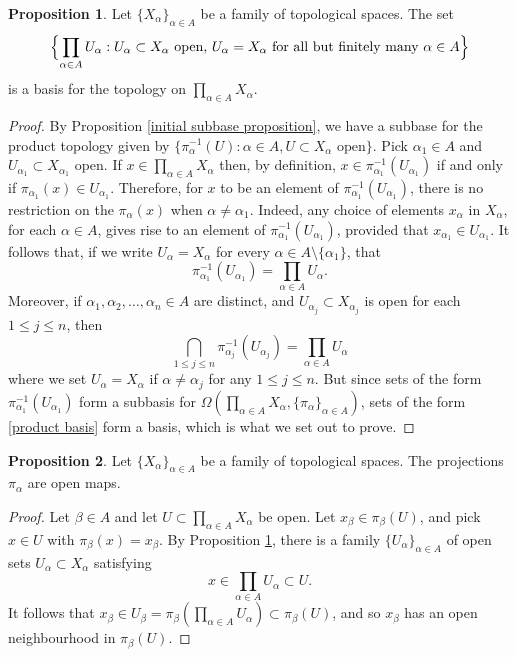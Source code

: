 \documentclass{book}
\theoremstyle{definition}
\newtheorem{proposition}{Proposition}[section]
\theoremstyle{remark}
\newcommand{\initial}[2]{\Omega(#1, #2)}
\begin{document}
\begin{proposition}\label{product basis proposition}
    Let $\{X_\alpha\}_{\alpha\in A}$ be a family of topological spaces. The set
        $$\Bigl\{\prod_{\alpha\in A} U_\alpha : U_\alpha\subset X_\alpha\text{ open},\,U_\alpha=X_\alpha\text{ for all but finitely many }\alpha\in A\Bigr\}$$
    is a basis for the topology on $\prod_{\alpha\in A} X_\alpha$.
\end{proposition}
\begin{proof}
    By Proposition \ref{initial subbase proposition}, we have a subbase for the product topology given by $\{\pi_\alpha^{-1}(U) : \alpha\in A, U\subset X_\alpha\text{ open}\}$. Pick $\alpha_1\in A$ and $U_{\alpha_1}\subset X_{\alpha_1}$ open. If $x\in\prod_{\alpha\in A} X_\alpha$ then, by definition, $x\in \pi^{-1}_{\alpha_1}(U_{\alpha_1})$ if and only if $\pi_{\alpha_1}(x)\in U_{\alpha_1}$. Therefore, for $x$ to be an element of $\pi^{-1}_{\alpha_1}(U_{\alpha_1})$, there is no restriction on the $\pi_\alpha(x)$ when $\alpha\neq\alpha_1$. Indeed, any choice of elements $x_\alpha$ in $X_\alpha$, for each $\alpha\in A$, gives rise to an element of $\pi^{-1}_{\alpha_1}(U_{\alpha_1})$, provided that $x_{\alpha_1}\in U_{\alpha_1}$. It follows that, if we write $U_\alpha=X_\alpha$ for every $\alpha\in A\setminus\{\alpha_1\}$, that
        $$\pi^{-1}_{\alpha_1}(U_{\alpha_1})=\prod_{\alpha\in A} U_\alpha.$$
    Moreover, if $\alpha_1,\alpha_2,\hdots, \alpha_n\in A$ are distinct, and $U_{\alpha_j}\subset X_{\alpha_j}$ is open for each $1\leq j\leq n$, then
    \begin{equation}\label{product basis}
        \bigcap_{1\leq j\leq n}\pi^{-1}_{\alpha_j}(U_{\alpha_j})=\prod_{\alpha\in A} U_\alpha
    \end{equation}
    where we set $U_\alpha=X_\alpha$ if $\alpha\neq \alpha_j$ for any $1\leq j\leq n$. But since sets of the form $\pi^{-1}_{\alpha_1}(U_{\alpha_1})$ form a subbasis for $\initial{\prod_{\alpha\in A}X_\alpha}{\{\pi_{\alpha}\}_{\alpha\in A}}$, sets of the form \eqref{product basis} form a basis, which is what we set out to prove.
\end{proof}

\begin{proposition}
Let $\{X_\alpha\}_{\alpha\in A}$ be a family of topological spaces. The projections $\pi_\alpha$ are open maps.
\end{proposition}
\begin{proof}
Let $\beta\in A$ and let $U\subset\prod_{\alpha\in A}X_\alpha$ be open. Let $x_\beta\in\pi_\beta(U)$, and pick $x\in U$ with $\pi_\beta(x)=x_\beta$. By Proposition \ref{product basis proposition}, there is a family $\{U_\alpha\}_{\alpha\in A}$ of open sets $U_\alpha\subset X_\alpha$ satisfying
    $$x\in \prod_{\alpha\in A} U_\alpha\subset U.$$
It follows that $x_\beta\in U_\beta=\pi_\beta(\prod_{\alpha\in A} U_\alpha)\subset \pi_\beta(U)$, and so $x_\beta$ has an open neighbourhood in $\pi_\beta(U)$.
\end{proof}
\end{document}
